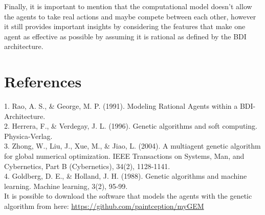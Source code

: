 \documentclass[a4paper]{article}
\begin{document}
Finally, it is important to mention that the computational model doesn't allow the agents to take real actions and maybe compete between each other, however it still provides important insights by considering the features that make one agent as effective as possible by assuming it is rational as defined by the BDI architecture.

\section{References}

1. Rao, A. S., \& George, M. P. (1991). Modeling Rational Agents within a BDI-Architecture. \\

2. Herrera, F., \& Verdegay, J. L. (1996). Genetic algorithms and soft computing. Physica-Verlag. \\

3. Zhong, W., Liu, J., Xue, M., \& Jiao, L. (2004). A multiagent genetic algorithm for global numerical optimization. IEEE Transactions on Systems, Man, and Cybernetics, Part B (Cybernetics), 34(2), 1128-1141. \\

4. Goldberg, D. E., \& Holland, J. H. (1988). Genetic algorithms and machine learning. Machine learning, 3(2), 95-99. \\

It is possible to download the software that models the agents with the genetic algorithm from here: \url{https://github.com/paintception/myGEM}
\end{document}
